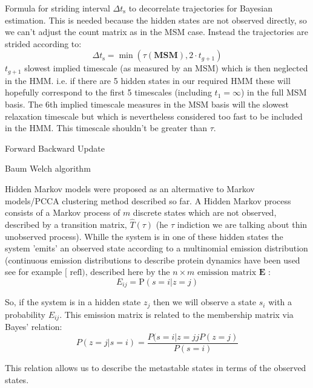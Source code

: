 Formula for striding interval $\Delta t_{\mathrm{s}}$ to decorrelate trajectories for Bayesian estimation. This is needed because the hidden states are not observed directly, so we can't adjust the count matrix as in the MSM case. Instead the trajectories are strided according to: 
\begin{equation}\label{eqn:hmm_striding}
    \Delta t_{\mathrm{s}} = \min{\left(\tau(\mathbf{MSM}), 2\cdot t_{g+1}\right)}
\end{equation}
$t_{g+1}$ slowest implied timescale (as measured by an MSM) which is then neglected in the HMM. i.e. if there are 5 hidden states in our required HMM these will hopefully correspond to the first 5 timescales (including $t_{1}=\infty$) in the full MSM basis. The 6th implied timescale measures in the MSM basis will the slowest relaxation timescale but which is nevertheless considered too fast to be included in the HMM. This timescale shouldn't be greater than $\tau$. 

\begin{algorithm}\label{alg:baum_welch}
Forward
Backward
Update
\caption{Baum Welch algorithm}
\end{algorithm}


Hidden Markov models were proposed as an altermative to Markov models/PCCA clustering method described so far. A Hidden Markov process consists of a Markov process of $m$ discrete states which are not observed, described by a transition matrix, $\widehat{T}(\tau)$ (he $\tau$ indiction we are talking about thin unobserved process). Whille the system is in one of these hidden states the system 'emits' an observed state according to a multinomial emission distribution (continuous emission distributions to describe protein dynamics have been used see for example $[\text { refl), described here by the } n \times m \text { emission matrix } \mathbf{E}$ :
\begin{equation}
E_{i j}=\mathrm{P}(s=i | z=j)
\end{equation}

So, if the system is in a hidden state $z_{j}$ then we will observe a state $s_{i}$ with a probability $E_{i j}$. This emission matrix is related to the membership matrix via Bayes' relation:
\begin{equation}
P(z=j | s=i)=\frac{P(s=i | z=j j P(z=j)}{P(s=i)}
\end{equation}

This relation allows us to describe the metastable states in terms of the observed states.

